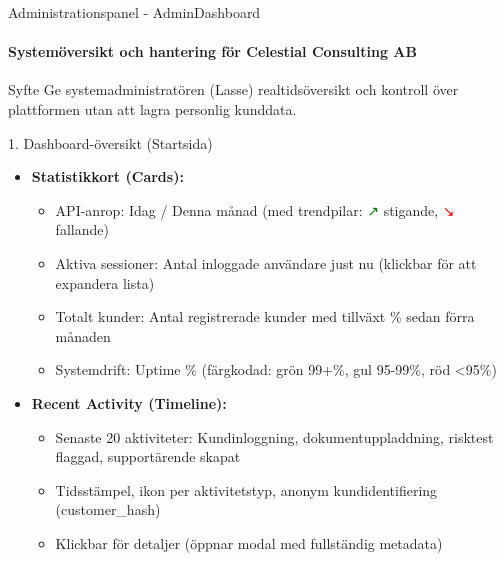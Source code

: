 \documentclass[10pt]{beamer}
\begin{document}
\begin{frame}{Administrationspanel - AdminDashboard}
\framesubtitle{Systemöversikt och hantering för Celestial Consulting AB}

\begin{block}{Syfte}
Ge systemadministratören (Lasse) realtidsöversikt och kontroll över plattformen utan att lagra personlig kunddata.
\end{block}

\begin{block}{1. Dashboard-översikt (Startsida)}
  \begin{itemize}
    \item \textbf{Statistikkort (Cards):}
      \begin{itemize}
        \item API-anrop: Idag / Denna månad (med trendpilar: \textcolor{green}{↗} stigande, \textcolor{red}{↘} fallande)
        \item Aktiva sessioner: Antal inloggade användare just nu (klickbar för att expandera lista)
        \item Totalt kunder: Antal registrerade kunder med tillväxt \% sedan förra månaden
        \item Systemdrift: Uptime \% (färgkodad: grön 99+\%, gul 95-99\%, röd <95\%)
      \end{itemize}
    \item \textbf{Recent Activity (Timeline):}
      \begin{itemize}
        \item Senaste 20 aktiviteter: Kundinloggning, dokumentuppladdning, risktest flaggad, supportärende skapat
        \item Tidsstämpel, ikon per aktivitetstyp, anonym kundidentifiering (customer\_hash)
        \item Klickbar för detaljer (öppnar modal med fullständig metadata)
      \end{itemize}
  \end{itemize}
\end{block}

\end{frame}

\end{document}

